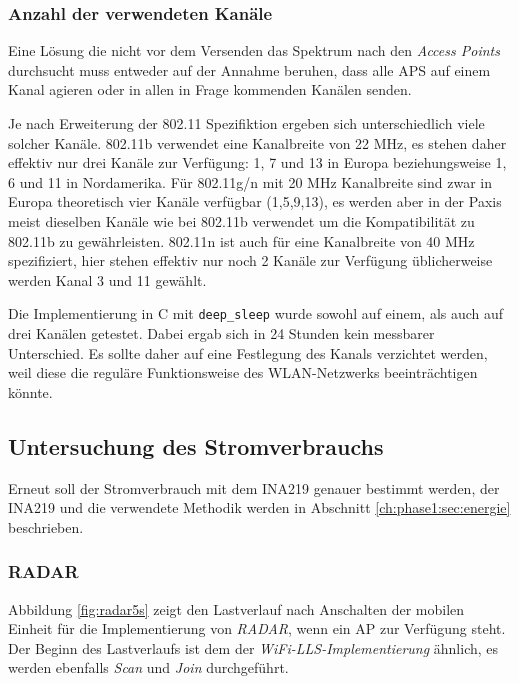 \subsubsection{Anzahl der verwendeten Kanäle}
Eine Lösung die nicht vor dem Versenden das Spektrum nach den \emph{Access Points} durchsucht muss entweder auf der Annahme beruhen, dass alle APS auf einem Kanal agieren oder in allen in Frage kommenden Kanälen senden.

Je nach Erweiterung der 802.11 Spezifiktion ergeben sich unterschiedlich viele solcher Kanäle.
802.11b verwendet eine Kanalbreite von 22 MHz, es stehen daher effektiv nur drei Kanäle zur Verfügung: 1, 7 und 13 in Europa beziehungsweise 1, 6 und 11 in Nordamerika.
Für 802.11g/n mit 20 MHz Kanalbreite sind zwar in Europa theoretisch vier Kanäle verfügbar (1,5,9,13), es werden aber in der Paxis meist dieselben Kanäle wie bei 802.11b verwendet um die Kompatibilität zu 802.11b zu gewährleisten.
802.11n ist auch für eine Kanalbreite von 40 MHz spezifiziert, hier stehen effektiv nur noch 2 Kanäle zur Verfügung üblicherweise werden Kanal 3 und 11 gewählt.

Die Implementierung in C mit \texttt{deep\_sleep} wurde sowohl auf einem, als auch auf drei Kanälen getestet.
Dabei ergab sich in 24 Stunden kein messbarer Unterschied.
Es sollte daher auf eine Festlegung des Kanals verzichtet werden, weil diese die reguläre Funktionsweise des WLAN-Netzwerks beeinträchtigen könnte.


\subsection{Untersuchung des Stromverbrauchs}
Erneut soll der Stromverbrauch mit dem INA219 genauer bestimmt werden, der INA219 und die verwendete Methodik werden in Abschnitt \ref{ch:phase1:sec:energie} beschrieben.


\subsubsection{RADAR}
\label{ch:phase2:sec:powerradar}
Abbildung \ref{fig:radar5s} zeigt den Lastverlauf nach Anschalten der mobilen Einheit für die Implementierung von \emph{RADAR}, wenn ein AP zur Verfügung steht. 
Der Beginn des Lastverlaufs ist dem der \emph{WiFi-LLS-Implementierung} ähnlich, es werden ebenfalls \emph{Scan} und \emph{Join} durchgeführt.

